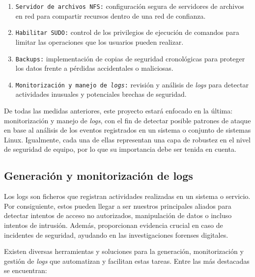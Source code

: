 \begin{enumerate}[label=\Alph*.,itemsep=2pt,parsep=1pt]
    \item \texttt{Servidor de archivos \gls{NFS}:} configuración segura de servidores de archivos en red para compartir recursos dentro de una red de confianza. \\
    \item \texttt{Habilitar \texttt{\gls{SUDO}}:} control de los privilegios de ejecución de comandos para limitar las operaciones que los usuarios pueden realizar. \\
    \item \texttt{Backups:} implementación de copias de seguridad cronológicas para proteger los datos frente a pérdidas accidentales o maliciosas. \\
    \item \texttt{Monitorización y manejo de \textit{logs}:} revisión y análisis de \textit{logs} para detectar actividades inusuales y potenciales brechas de seguridad.
\end{enumerate}

De todas las medidas anteriores, este proyecto estará enfocado en la última: monitorización y manejo de \textit{logs}, con el fin de detectar posible patrones de ataque en base al análisis de los eventos registrados en un sistema o conjunto de sistemas Linux. Igualmente, cada una de ellas representan una capa de robustez en el nivel de seguridad de equipo, por lo que su importancia debe ser tenida en cuenta.


\vspace{-0.3cm}

\subsection{Generación y monitorización de logs}

Los logs son ficheros que registran actividades realizadas en un sistema o servicio. Por consiguiente, estos pueden llegar a ser nuestros principales aliados para detectar intentos de acceso no autorizados, manipulación de datos o incluso intentos de intrusión. Además, proporcionan evidencia crucial en caso de incidentes de seguridad, ayudando en las investigaciones forenses digitales.

Existen diversas herramientas y soluciones para la generación, monitorización y gestión de \textit{logs} que automatizan y facilitan estas tareas. Entre las más destacadas se encuentran: \\

